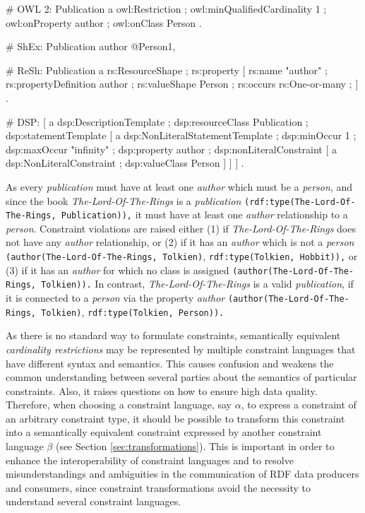 \documentclass[a4paper,fontsize=11pt]{scrartcl}
\newcommand{\ms}[1]{\texttt{#1}}
\begin{document}
\begin{ex}
# OWL 2:
Publication
    a owl:Restriction ;
    owl:minQualifiedCardinality 1 ;
    owl:onProperty author ;
    owl:onClass Person .
		
# ShEx:
Publication { author @Person{1, } }

# ReSh:
Publication a rs:ResourceShape ; rs:property [
    rs:name "author" ; rs:propertyDefinition author ;
    rs:valueShape Person ;
    rs:occurs rs:One-or-many ; ] .
		
# DSP:
[   a dsp:DescriptionTemplate ; 
    dsp:resourceClass Publication ; 
    dsp:statementTemplate [ a dsp:NonLiteralStatementTemplate ;
        dsp:minOccur 1 ; dsp:maxOccur "infinity" ; 
        dsp:property author ; 
        dsp:nonLiteralConstraint [ a dsp:NonLiteralConstraint ;
            dsp:valueClass Person ] ] ] .
\end{ex}

As every \emph{publication} must have at least one \emph{author} which must be a \emph{person}, 
and since the book \emph{The-Lord-Of-The-Rings} is a \emph{publication} {\small\ms{(rdf:type(The-Lord-Of-The-Rings, Publication)),}} 
it must have at least one \emph{author} relationship to a \emph{person}.
Constraint violations are raised either (1) if
\emph{The-Lord-Of-The-Rings} does not have any \emph{author} relationship, or (2) if 
it has an \emph{author} which is not a \emph{person} \\
{\small\ms{(author(The-Lord-Of-The-Rings, Tolkien)}, \ms{rdf:type(Tolkien, Hobbit)),}} 
or (3) if it has an \emph{author} for which no class is assigned
{\small\ms{(author(The-Lord-Of-The-Rings, Tolkien)).}}
In contrast, \emph{The-Lord-Of-The-Rings} is a valid \emph{publication}, if it is connected to a \emph{person} via the property \emph{author}
{\small\ms{(author(The-Lord-Of-The-Rings, Tolkien)}, \ms{rdf:type(Tolkien, Person)).}}

As there is no standard way to formulate constraints, 
semantically equivalent \emph{cardinality restrictions} may be represented by multiple constraint languages that have different syntax and semantics.
This causes confusion and weakens the common understanding between several parties about the semantics of particular constraints. Also, it raises  questions on how to ensure high data quality. 
Therefore, when choosing a constraint language, say \ms{$\alpha$}, to express a constraint of an arbitrary constraint type, it should be possible to transform this constraint into a semantically equivalent constraint expressed by another constraint language \ms{$\beta$} (see Section \ref{sec:transformations}). 
This is important in order to enhance the interoperability of constraint languages and to resolve misunderstandings and ambiguities in the communication of RDF data producers and consumers, 
since constraint transformations avoid the necessity to understand several constraint languages.
\end{document}
